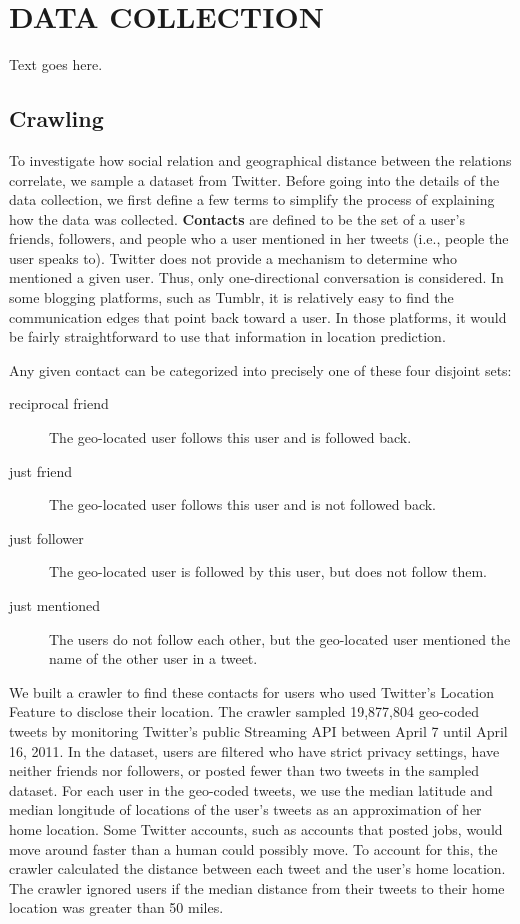 \chapter{\uppercase {Data Collection}}

Text goes here.

\section{Crawling}
To investigate how social relation and geographical distance between the
relations correlate, we sample a dataset from Twitter.
Before going into the details of the data collection, we first define a few
terms to simplify the process of explaining how the data was collected.
\textbf{Contacts} are defined to be the set of a user's friends, followers, and
people who a user mentioned in her tweets (i.e., people the user speaks to). 
Twitter does not provide a mechanism to determine who mentioned a given user.
Thus, only one-directional conversation is considered.
In some blogging platforms, such as Tumblr, it is relatively easy to find the
communication edges that point back toward a user.
In those platforms, it would be fairly straightforward to use that information in location prediction.

Any given contact can be categorized into precisely one of these four disjoint sets:
\begin{description}
\item[reciprocal friend] The geo-located user follows this user and is followed back.
\item[just friend] The geo-located user follows this user and is not followed back.
\item[just follower] The geo-located user is followed by this user, but does not follow them.
\item[just mentioned] The users do not follow each other, but the geo-located user mentioned the name of the other user in a tweet.
\end{description}

We built a crawler to find these contacts for users who used Twitter's Location
Feature to disclose their location.
The crawler sampled 19,877,804 geo-coded tweets by monitoring Twitter's public
Streaming API between April 7 until April 16, 2011.
In the dataset, users are filtered who have strict privacy settings, have
neither friends nor followers, or posted fewer than two tweets in the sampled
dataset.
For each user in the geo-coded tweets, we use the median latitude and median
longitude of locations of the user's tweets as an approximation of her home
location. 
Some Twitter accounts, such as accounts that posted jobs, would
move around faster than a human could possibly move. To account for this, the crawler
calculated the distance between each tweet and the user's home location. The crawler
ignored users if the median distance from their tweets to their home location
was greater than 50 miles.

